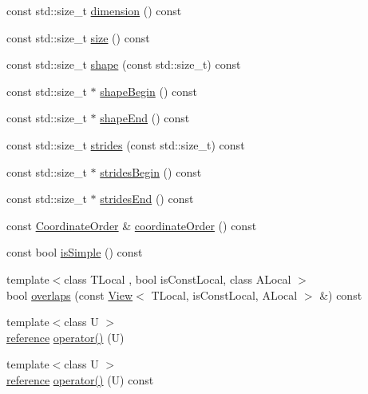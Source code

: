 \begin{DoxyCompactItemize}
\item 
const std\+::size\+\_\+t \hyperlink{classandres_1_1View_a36308e1cf6bb6b17e8b0df6537c1ec39}{dimension} () const 
\item 
const std\+::size\+\_\+t \hyperlink{classandres_1_1View_afc9504378ae2eefd7540a71d9f227338}{size} () const 
\item 
const std\+::size\+\_\+t \hyperlink{classandres_1_1View_a9bc3d88b3e2bdf432dd68f36ff33deb3}{shape} (const std\+::size\+\_\+t) const 
\item 
const std\+::size\+\_\+t $\ast$ \hyperlink{classandres_1_1View_ad43d1b74245d56970176c75746c7c88b}{shape\+Begin} () const 
\item 
const std\+::size\+\_\+t $\ast$ \hyperlink{classandres_1_1View_ac56e049443673fe1311b312030fadc2d}{shape\+End} () const 
\item 
const std\+::size\+\_\+t \hyperlink{classandres_1_1View_a3c4b2cee088b6cf8232289cbb50bd2b4}{strides} (const std\+::size\+\_\+t) const 
\item 
const std\+::size\+\_\+t $\ast$ \hyperlink{classandres_1_1View_a44f545270b7e66a749c2a8988a5dcd92}{strides\+Begin} () const 
\item 
const std\+::size\+\_\+t $\ast$ \hyperlink{classandres_1_1View_ab4ee3379ba0903bb14645c397d2a85b6}{strides\+End} () const 
\item 
const \hyperlink{namespaceandres_a2ac8b7aa89d44e8188a7c0ba50f4306b}{Coordinate\+Order} \& \hyperlink{classandres_1_1View_a7ca5aa89f5c22d80e3c7037e55c78cdb}{coordinate\+Order} () const 
\item 
const bool \hyperlink{classandres_1_1View_ad747c5f0d3caecaa535afd85c1e5c250}{is\+Simple} () const 
\item 
{\footnotesize template$<$class T\+Local , bool is\+Const\+Local, class A\+Local $>$ }\\bool \hyperlink{classandres_1_1View_afa268e37459476d9ca233d741e4bc63c}{overlaps} (const \hyperlink{classandres_1_1View}{View}$<$ T\+Local, is\+Const\+Local, A\+Local $>$ \&) const 
\item 
{\footnotesize template$<$class U $>$ }\\\hyperlink{classandres_1_1View_aebdd1f19272b743b4422ff8ba18fc11a}{reference} \hyperlink{classandres_1_1View_a8c9e16f74973fefb3bacb1c7fb844441}{operator()} (U)
\item 
{\footnotesize template$<$class U $>$ }\\\hyperlink{classandres_1_1View_aebdd1f19272b743b4422ff8ba18fc11a}{reference} \hyperlink{classandres_1_1View_ae06586b90683457833c4f76ac6bc714e}{operator()} (U) const 

\end{DoxyCompactItemize}
